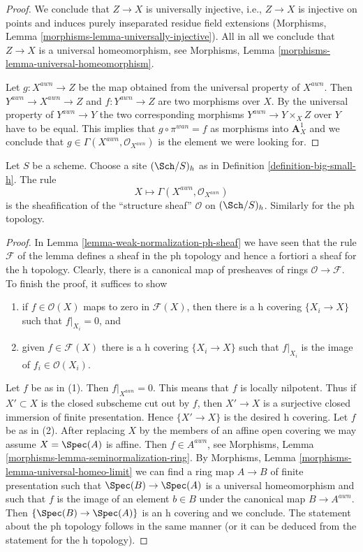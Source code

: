\begin{proof}
\medskip\noindent
We conclude that $Z \to X$ is universally injective, i.e.,
$Z \to X$ is injective on points and induces
purely inseparated residue field extensions
(Morphisms, Lemma \ref{morphisms-lemma-universally-injective}).
All in all we conclude that $Z \to X$ is a universal homeomorphism, see
Morphisms, Lemma \ref{morphisms-lemma-universal-homeomorphism}.

\medskip\noindent
Let $g : X^{awn} \to Z$ be the map obtained from the universal property
of $X^{awn}$. Then $Y^{awn} \to X^{awn} \to Z$ and $f : Y^{awn} \to Z$
are two morphisms over $X$. By the universal property of
$Y^{awn} \to Y$ the two corresponding morphisms
$Y^{awn} \to Y \times_X Z$ over $Y$ have to be equal. This implies
that $g \circ \pi^{wan} = f$ as morphisms into $\mathbf{A}^1_X$
and we conclude that $g \in \Gamma(X^{awn}, \mathcal{O}_{X^{awn}})$
is the element we were looking for.
\end{proof}

\begin{lemma}
\label{lemma-weak-normalization-h-sheaf}
Let $S$ be a scheme. Choose a site $(\Sch/S)_h$
as in Definition \ref{definition-big-small-h}.
The rule
$$
X \longmapsto \Gamma(X^{awn}, \mathcal{O}_{X^{awn}})
$$
is the sheafification of the ``structure sheaf'' $\mathcal{O}$
on $(\Sch/S)_h$. Similarly for the ph topology.
\end{lemma}

\begin{proof}
In Lemma \ref{lemma-weak-normalization-ph-sheaf}
we have seen that the rule $\mathcal{F}$ of the lemma
defines a sheaf in the ph topology and hence a fortiori
a sheaf for the h topology. Clearly, there is a canonical map
of presheaves of rings $\mathcal{O} \to \mathcal{F}$.
To finish the proof, it suffices to show
\begin{enumerate}
\item if $f \in \mathcal{O}(X)$ maps to zero in $\mathcal{F}(X)$,
then there is a h covering $\{X_i \to X\}$ such that $f|_{X_i} = 0$, and
\item given $f \in \mathcal{F}(X)$ there is a h covering
$\{X_i \to X\}$ such that $f|_{X_i}$ is the image of $f_i \in \mathcal{O}(X_i)$.
\end{enumerate}
Let $f$ be as in (1). Then $f|_{X^{awn}} = 0$. This means that $f$
is locally nilpotent. Thus if $X' \subset X$ is the closed subscheme
cut out by $f$, then $X' \to X$ is a surjective closed immersion of
finite presentation. Hence $\{X' \to X\}$ is the desired h covering.
Let $f$ be as in (2). After replacing $X$ by the members of an
affine open covering we may assume $X = \Spec(A)$ is affine.
Then $f \in A^{awn}$, see
Morphisms, Lemma \ref{morphisms-lemma-seminormalization-ring}.
By Morphisms, Lemma \ref{morphisms-lemma-universal-homeo-limit}
we can find a ring map $A \to B$ of finite presentation
such that $\Spec(B) \to \Spec(A)$ is a universal homeomorphism
and such that $f$ is the image of an element $b \in B$ under
the canonical map $B \to A^{awn}$. Then
$\{\Spec(B) \to \Spec(A)\}$ is an h covering and we conclude.
The statement about the ph topology follows in the same manner
(or it can be deduced from the statement for the h topology).
\end{proof}

